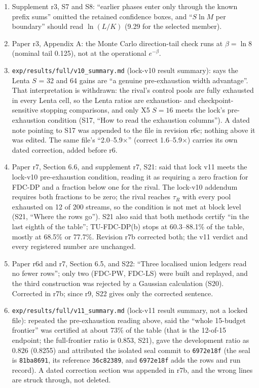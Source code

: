 \documentclass[sigconf,anonymous,review]{acmart}
\begin{document}
\begin{enumerate}
\item Supplement r3, S7 and S8: ``earlier phases enter only through the known prefix sums'' omitted the retained confidence boxes, and ``$S\ln M$ per boundary'' should read $\ln(L/K)$ (9.29 for the selected member).
\item Paper r3, Appendix A: the Monte Carlo direction-tail check runs at $\beta = \ln 8$ (nominal tail 0.125), not at the operational $e^{-\beta}$.
\item \texttt{exp/results/full/v10\_summary.md} (lock-v10 result summary): says the Lenta $S$ = 32 and 64 gains are ``a genuine pre-exhaustion width advantage''. That interpretation is withdrawn: the rival's control pools are fully exhausted in every Lenta cell, so the Lenta ratios are exhaustion- and checkpoint-sensitive stopping comparisons, and only X5 $S = 16$ meets the lock's pre-exhaustion condition (S17, ``How to read the exhaustion columns''). A dated note pointing to S17 was appended to the file in revision r6c; nothing above it was edited. The same file's ``2.0--5.9$\times$'' (correct 1.6--5.9$\times$) carries its own dated correction, added before r6.
\item Paper r7, Section 6.6, and supplement r7, S21: said that lock v11 meets the lock-v10 pre-exhaustion condition, reading it as requiring a zero fraction for FDC-DP and a fraction below one for the rival. The lock-v10 addendum requires both fractions to be zero; the rival reaches $\tau_R$ with every pool exhausted on 12 of 200 streams, so the condition is not met at block level (S21, ``Where the rows go''). S21 also said that both methods certify ``in the last eighth of the table''; TU-FDC-DP(b) stops at 60.3--88.1\% of the table, mostly at 68.5\% or 77.7\%. Revision r7b corrected both; the v11 verdict and every registered number are unchanged.
\item Paper r6d and r7, Section 6.5, and S22: ``Three localised union ledgers read no fewer rows''; only two (FDC-PW, FDC-LS) were built and replayed, and the third construction was rejected by a Gaussian calculation (S20). Corrected in r7b; since r9, S22 gives only the corrected sentence.
\item \texttt{exp/results/full/v11\_summary.md} (lock-v11 result summary, not a locked file): repeated the pre-exhaustion reading above, said the ``whole 15-budget frontier'' was certified at about 73\% of the table (that is the 12-of-15 endpoint; the full-frontier ratio is 0.853, S21), gave the development ratio as 0.826 (0.8255) and attributed the isolated seal commit to \texttt{6972e18f} (the seal is \texttt{81ba8691}, its reference \texttt{36c82389}, and \texttt{6972e18f} adds the rows and run record). A dated correction section was appended in r7b, and the wrong lines are struck through, not deleted.

\end{enumerate}
\end{document}
